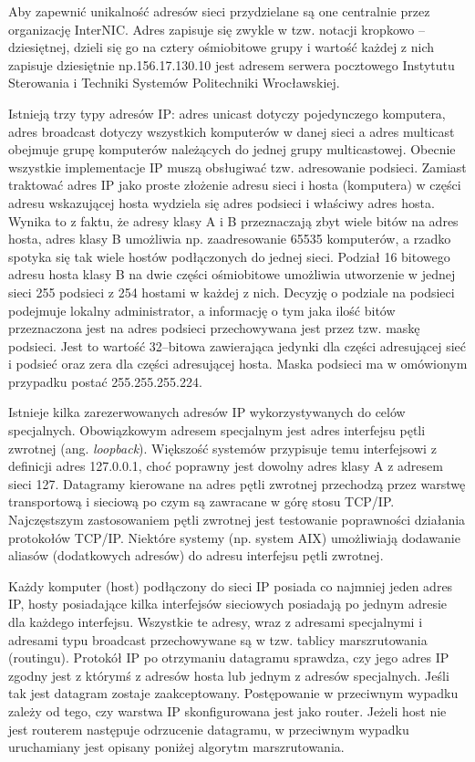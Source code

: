 Aby zapewnić unikalność adresów sieci przydzielane są one centralnie przez organizację InterNIC. Adres zapisuje
się zwykle w tzw. notacji kropkowo -- dziesiętnej, dzieli się go na cztery ośmiobitowe  grupy i wartość każdej z 
nich zapisuje dziesiętnie np.156.17.130.10 jest adresem serwera pocztowego Instytutu Sterowania i Techniki Systemów
Politechniki Wrocławskiej.

Istnieją trzy typy adresów IP: adres unicast dotyczy pojedynczego komputera, adres broadcast dotyczy 
wszystkich komputerów w danej sieci a adres multicast obejmuje grupę komputerów należących do jednej grupy 
multicastowej. Obecnie wszystkie implementacje IP muszą obsługiwać tzw. adresowanie podsieci. Zamiast traktować 
adres IP jako proste złożenie adresu sieci i hosta (komputera) w części adresu wskazującej hosta wydziela się 
adres podsieci i właściwy adres hosta. Wynika to z faktu, że adresy klasy A i B przeznaczają zbyt wiele bitów na 
adres hosta, adres klasy B umożliwia np. zaadresowanie 65535 komputerów, a rzadko spotyka się tak wiele hostów 
podłączonych do jednej sieci. Podział 16 bitowego adresu hosta klasy B na dwie części ośmiobitowe umożliwia 
utworzenie w jednej sieci 255 podsieci z 254 hostami w każdej z nich. Decyzję o podziale na podsieci podejmuje 
lokalny administrator, a informację o tym jaka ilość bitów przeznaczona jest na adres podsieci przechowywana 
jest przez tzw. maskę podsieci. Jest to wartość 32--bitowa  zawierająca jedynki dla części adresującej sieć i 
podsieć oraz zera dla części adresującej hosta. Maska podsieci ma w omówionym przypadku postać 255.255.255.224.

Istnieje kilka zarezerwowanych adresów IP wykorzystywanych do celów specjalnych. Obowiązkowym adresem 
specjalnym jest adres interfejsu pętli zwrotnej (ang. \emph{loopback}). Większość systemów przypisuje temu interfejsowi 
z definicji adres 127.0.0.1, choć poprawny jest dowolny adres klasy A z adresem sieci 127. Datagramy kierowane 
na adres pętli zwrotnej przechodzą przez warstwę transportową i sieciową po czym są zawracane w górę stosu 
TCP/IP. Najczęstszym zastosowaniem pętli zwrotnej jest testowanie poprawności działania protokołów TCP/IP. 
Niektóre systemy (np. system AIX) umożliwiają dodawanie aliasów (dodatkowych adresów) do adresu interfejsu pętli 
zwrotnej.

Każdy komputer (host) podłączony do sieci IP posiada co najmniej jeden adres IP, hosty posiadające kilka 
interfejsów sieciowych posiadają po jednym adresie dla każdego interfejsu. Wszystkie te adresy, wraz z adresami 
specjalnymi i adresami typu broadcast przechowywane są w tzw. tablicy marszrutowania (routingu). Protokół IP po otrzymaniu 
datagramu sprawdza, czy jego adres IP zgodny jest z którymś z adresów hosta lub jednym z adresów specjalnych. 
Jeśli tak jest datagram zostaje zaakceptowany. Postępowanie w przeciwnym wypadku zależy od tego, czy warstwa IP 
skonfigurowana jest jako router. Jeżeli host nie jest routerem następuje odrzucenie datagramu, w przeciwnym wypadku
uruchamiany jest opisany poniżej algorytm marszrutowania.

